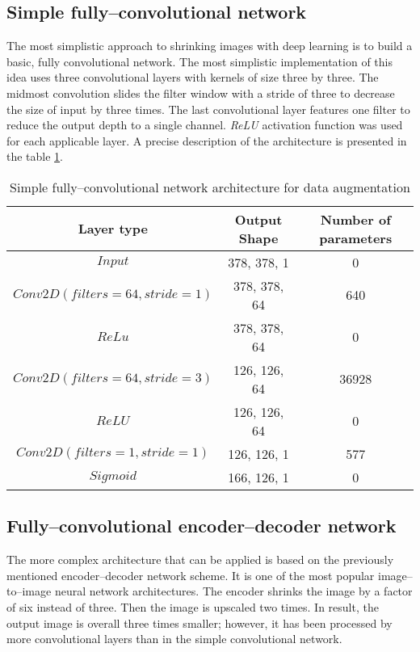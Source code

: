 \subsection{Simple fully--convolutional network}
The most simplistic approach to shrinking images with deep learning is to build a basic, fully convolutional network.
The most simplistic implementation of this idea uses three convolutional layers with kernels of size three by three.
The midmost convolution slides the filter window with a stride of three to decrease the size of input by three times.
The last convolutional layer features one filter to reduce the output depth to a single channel.
\textit{ReLU} activation function was used for each applicable layer.
A precise description of the architecture is presented in the table \ref{tab:simple-conv-arch}.
\begin{table}
    \centering
    \caption{Simple fully--convolutional network architecture for data augmentation}
    \label{tab:simple-conv-arch}
    \begin{tabular}{ccc}
        \toprule
        Layer type & Output Shape & Number of parameters \\
        \midrule
        $ Input $      & 378, 378, 1  & 0                    \\
        $ Conv2D(filters=64, stride=1) $ & 378, 378, 64 & 640 \\
        $ ReLu $ & 378, 378, 64 & 0 \\
        $ Conv2D(filters=64, stride=3) $ & 126, 126, 64 & 36928 \\
        $ ReLU $ & 126, 126, 64 & 0 \\
        $ Conv2D(filters=1, stride=1) $ & 126, 126, 1 & 577 \\
        $ Sigmoid $ & 166, 126, 1 & 0 \\
        \bottomrule
    \end{tabular}
\end{table}

\subsection{Fully--convolutional encoder--decoder network}
The more complex architecture that can be applied is based on the previously mentioned encoder--decoder network scheme.
It is one of the most popular image--to--image neural network architectures.
The encoder shrinks the image by a factor of six instead of three.
Then the image is upscaled two times.
In result, the output image is overall three times smaller; however, it has been processed by more convolutional layers than in the simple convolutional network.

